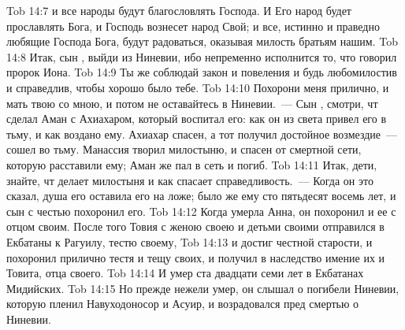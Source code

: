 \vs Tob 14:7 и все народы будут благословлять Господа. И Его народ будет прославлять Бога, и Господь вознесет народ Свой; и все, истинно и праведно любящие Господа Бога, будут радоваться, оказывая милость братьям нашим.
\vs Tob 14:8 Итак, сын , выйди из Ниневии, ибо непременно исполнится то, что говорил пророк Иона.
\vs Tob 14:9 Ты же соблюдай закон и повеления и будь любомилостив и справедлив, чтобы хорошо было тебе.
\vs Tob 14:10 Похорони меня прилично, и мать твою со мною, и потом не оставайтесь в Ниневии.~--- Сын , смотри, чт сделал Аман с Ахиахаром, который воспитал его: как он из света привел его в тьму, и как воздано ему. Ахиахар спасен, а тот получил достойное возмездие~--- сошел во тьму. Манассия творил милостыню, и спасен от смертной сети, которую расставили ему; Аман же пал в сеть и погиб.
\vs Tob 14:11 Итак, дети, знайте, чт делает милостыня и как спасает справедливость.~--- Когда он это сказал, душа его оставила его на ложе; было же ему сто пятьдесят восемь лет, и сын с честью похоронил его.
\rsbpar\vs Tob 14:12 Когда умерла Анна, он похоронил и ее с отцом своим. После того Товия с женою своею и детьми своими отправился в Екбатаны к Рагуилу, тестю своему,
\vs Tob 14:13 и достиг честной старости, и похоронил прилично тестя и тещу своих, и получил в наследство имение их и Товита, отца своего.
\vs Tob 14:14 И умер ста двадцати семи лет в Екбатанах Мидийских.
\vs Tob 14:15 Но прежде нежели умер, он слышал о погибели Ниневии, которую пленил Навуходоносор и Асуир, и возрадовался пред смертью о Ниневии.
